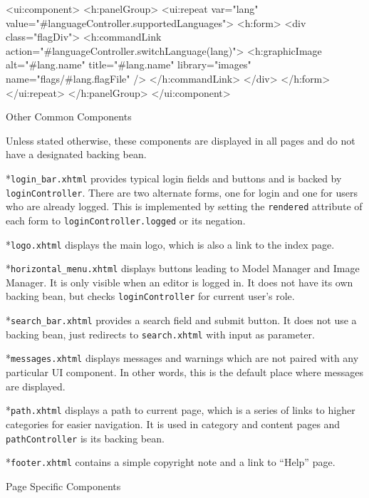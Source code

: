 \begtt

<ui:component>
  <h:panelGroup>
    <ui:repeat var="lang"
        value="#{languageController.supportedLanguages}">                    
      <h:form>
        <div class="flagDiv">
          <h:commandLink
              action="#{languageController.switchLanguage(lang)}">
            <h:graphicImage
                alt="#{lang.name}" title="#{lang.name}"
                library="images" name="flags/#{lang.flagFile}" />
          </h:commandLink>
        </div>
      </h:form>
    </ui:repeat>
  </h:panelGroup>
</ui:component>

\endtt

\secc Other Common Components

Unless stated otherwise, these components are displayed in all pages and do not have a designated backing bean.

\begitems

*{\tt login\_bar.xhtml} provides typical login fields and buttons and is backed by {\tt loginController}. There are two alternate forms, one for login and one for users who are already logged. This is implemented by setting the {\tt rendered} attribute of each form to {\tt loginController.logged} or its negation.

*{\tt logo.xhtml} displays the main logo, which is also a link to the index page.

*{\tt horizontal\_menu.xhtml} displays buttons leading to Model Manager and Image Manager. It is only visible when an editor is logged in. It does not have its own backing bean, but checks {\tt loginController} for current user’s role.

*{\tt search\_bar.xhtml} provides a search field and submit button. It does not use a backing bean, just redirects to {\tt search.xhtml} with input as  parameter.

*{\tt messages.xhtml} displays messages and warnings which are not paired with any particular UI component. In other words, this is the default place where messages are displayed.

*{\tt path.xhtml} displays a path to current page, which is a series of links to higher categories for easier navigation. It is used in category and content pages and {\tt pathController} is its backing bean.

*{\tt footer.xhtml} contains a simple copyright note and a link to “Help” page.

\enditems

\secc Page Specific Components

